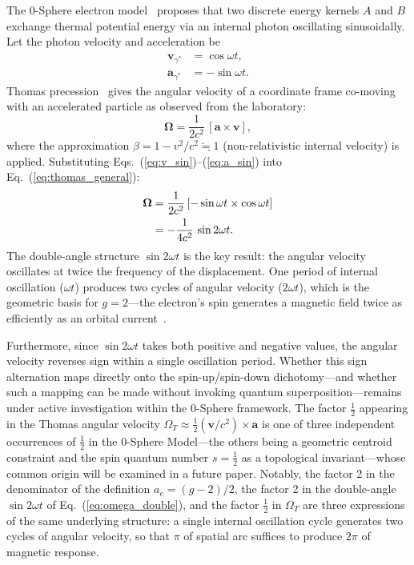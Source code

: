 \documentclass[%
 reprint, amsmath,amssymb, aps, prb, ]{revtex4-2}
\numberwithin{equation}{section}
\begin{document}
The 0-Sphere electron model~\cite{Hanamura_2018_01} proposes that two discrete energy kernels $A$ and $B$ exchange thermal potential energy via an internal photon oscillating sinusoidally. Let the photon velocity and acceleration be
\begin{align}
\boldsymbol{v}_{\gamma^*} &= \cos\omega t, \label{eq:v_sin} \\
\boldsymbol{a}_{\gamma^*} &= -\sin\omega t. \label{eq:a_sin}
\end{align}
Thomas precession~\cite{Thomas1926} gives the angular velocity of a coordinate frame co-moving with an accelerated particle as observed from the laboratory:
\begin{equation}
\boldsymbol{\Omega} = \frac{1}{2c^2}\,[\boldsymbol{a} \times \boldsymbol{v}],
\label{eq:thomas_general}
\end{equation}
where the approximation $\beta = 1 - v^2/c^2 \fallingdotseq 1$ (non-relativistic internal velocity) is applied. Substituting Eqs.~(\ref{eq:v_sin})--(\ref{eq:a_sin}) into Eq.~(\ref{eq:thomas_general}):
\begin{align}
\boldsymbol{\Omega}
&= \frac{1}{2c^2}\,[-\sin\omega t \times \cos\omega t] \notag \\
&= -\frac{1}{4c^2}\,\sin 2\omega t.
\label{eq:omega_double}
\end{align}
The double-angle structure $\sin 2\omega t$ is the key result: the angular velocity oscillates at twice the frequency of the displacement. One period of internal oscillation ($\omega t$) produces two cycles of angular velocity ($2\omega t$), which is the geometric basis for $g = 2$---the electron's spin generates a magnetic field twice as efficiently as an orbital current~\cite{Hanamura_2023_10,Hanamura_2025_13,Hanamura_2025_19}.

Furthermore, since $\sin 2\omega t$ takes both positive and negative values, the angular velocity reverses sign within a single oscillation period. Whether this sign alternation maps directly onto the spin-up/spin-down dichotomy---and whether such a mapping can be made without invoking quantum superposition---remains under active investigation within the 0-Sphere framework. The factor $\tfrac{1}{2}$ appearing in the Thomas angular velocity $\Omega_T \approx \tfrac{1}{2}(\mathbf{v}/c^2)\times\mathbf{a}$ is one of three independent occurrences of $\tfrac{1}{2}$ in the 0-Sphere Model---the others being a geometric centroid constraint and the spin quantum number $s=\tfrac{1}{2}$ as a topological invariant---whose common origin will be examined in a future paper. Notably, the factor 2 in the denominator of the definition $a_e = (g-2)/2$, the factor 2 in the double-angle $\sin 2\omega t$ of Eq.~(\ref{eq:omega_double}), and the factor $\tfrac{1}{2}$ in $\Omega_T$ are three expressions of the same underlying structure: a single internal oscillation cycle generates two cycles of angular velocity, so that $\pi$ of spatial arc suffices to produce $2\pi$ of magnetic response.
\end{document}
